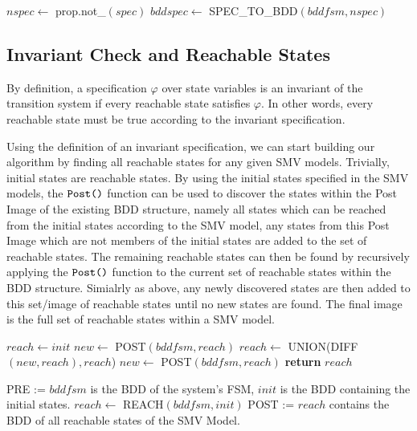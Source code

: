 \documentclass{article}
\begin{document}
\medskip

\begin{algorithmic}[1]
\State $nspec \leftarrow$ prop.not\_$(spec)$
\State $bddspec \leftarrow$ SPEC\_TO\_BDD$(bddfsm, nspec)$
\end{algorithmic}

\subsection{Invariant Check and Reachable States}

By definition, a specification $\varphi$ over state variables is an invariant of the transition system if every reachable state satisfies $\varphi$. In other words, every reachable state must be true according to the invariant specification.

\medskip

Using the definition of an invariant specification, we can start building our algorithm by finding all reachable states for any given SMV models. Trivially, initial states are reachable states. By using the initial states specified in the SMV models, the $\verb|Post()|$ function can be used to discover the states within the Post Image of the existing BDD structure, namely all states which can be reached from the initial states according to the SMV model, any states from this Post Image which are not members of the initial states are added to the set of reachable states. The remaining reachable states can then be found by recursively applying the $\verb|Post()|$ function to the current set of reachable states within the BDD structure. Simialrly as above, any newly discovered states are then added to this set/image of reachable states until no new states are found. The final image is the full set of reachable states within a SMV model.

\medskip

\begin{algorithmic}[1]
    \State $reach\leftarrow init$
    \State $new\leftarrow$ POST$(bddfsm, reach)$
        \State $reach\leftarrow$ UNION(DIFF$(new, reach),reach$)
        \State $new\leftarrow$ POST$(bddfsm, reach)$
    \EndWhile
    \State \textbf{return }$reach$
\EndFunction
\item[]
\State PRE := $bddfsm$ is the BDD of the system's FSM, $init$ is the BDD containing the initial states.
\State $reach\leftarrow$ REACH$(bddfsm, init)$
\State POST := $reach$ contains the BDD of all reachable states of the SMV Model.
\end{algorithmic}
\end{document}
